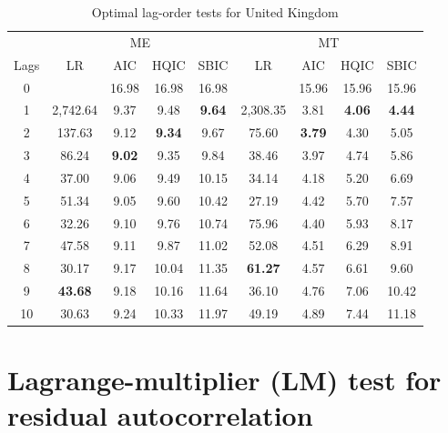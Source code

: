 \documentclass[a4paper, twoside]{templates/ociamthesis}
\begin{document}
\begin{table}[H]

\caption{\label{tab:TableC210}Optimal lag-order tests for United Kingdom}
\centering
\fontsize{10}{12}\selectfont
\begin{tabular}[t]{ccccccccc}
\toprule
\multicolumn{1}{c}{ } & \multicolumn{4}{c}{ME} & \multicolumn{4}{c}{MT} \\
\cmidrule(l{3pt}r{3pt}){2-5} \cmidrule(l{3pt}r{3pt}){6-9}
Lags & LR & AIC & HQIC & SBIC & LR & AIC & HQIC & SBIC\\
\midrule
0 &  & 16.98 & 16.98 & 16.98 &  & 15.96 & 15.96 & 15.96\\
1 & 2,742.64 & 9.37 & 9.48 & \textbf{9.64} & 2,308.35 & 3.81 & \textbf{4.06} & \textbf{4.44}\\
2 & 137.63 & 9.12 & \textbf{9.34} & 9.67 & 75.60 & \textbf{3.79} & 4.30 & 5.05\\
3 & 86.24 & \textbf{9.02} & 9.35 & 9.84 & 38.46 & 3.97 & 4.74 & 5.86\\
4 & 37.00 & 9.06 & 9.49 & 10.15 & 34.14 & 4.18 & 5.20 & 6.69\\
5 & 51.34 & 9.05 & 9.60 & 10.42 & 27.19 & 4.42 & 5.70 & 7.57\\
6 & 32.26 & 9.10 & 9.76 & 10.74 & 75.96 & 4.40 & 5.93 & 8.17\\
7 & 47.58 & 9.11 & 9.87 & 11.02 & 52.08 & 4.51 & 6.29 & 8.91\\
8 & 30.17 & 9.17 & 10.04 & 11.35 & \textbf{61.27} & 4.57 & 6.61 & 9.60\\
9 & \textbf{43.68} & 9.18 & 10.16 & 11.64 & 36.10 & 4.76 & 7.06 & 10.42\\
10 & 30.63 & 9.24 & 10.33 & 11.97 & 49.19 & 4.89 & 7.44 & 11.18\\
\bottomrule
\end{tabular}
\end{table}

\clearpage

\hypertarget{appendixb5}{%
\section{Lagrange-multiplier (LM) test for residual autocorrelation}\label{appendixb5}}
\end{document}
